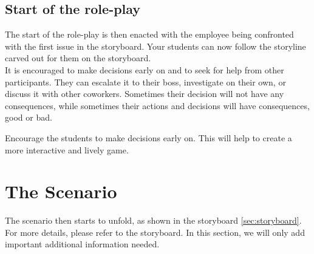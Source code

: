 \section{Start of the role-play}

The start of the role-play is then enacted with the employee being confronted with the first issue in the storyboard.
Your students can now follow the storyline carved out for them on the storyboard.
\\

It is encouraged to make decisions early on and to seek for help from other participants.
They can escalate it to their boss, investigate on their own, or discuss it with other coworkers.
Sometimes their decision will not have any consequences, while sometimes their actions and decisions will have consequences, good or bad.\
\\

\begin{hint}
    Encourage the students to make decisions early on.
    This will help to create a more interactive and lively game.
\end{hint}
\chapter{The Scenario}

\begin{hint}
    The scenario then starts to unfold, as shown in the storyboard \autoref{sec:storyboard}.
    For more details, please refer to the storyboard.
    In this section, we will only add important additional information needed.
\end{hint}